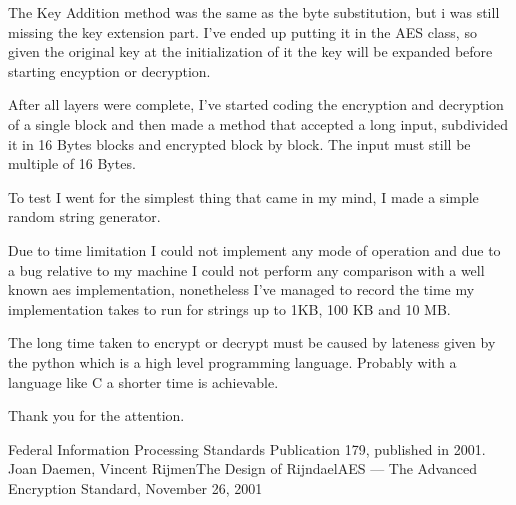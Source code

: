 \documentclass[11 pt]{article}
\begin{document}
The Key Addition method was the same as the byte substitution, but i was still missing the key extension part. I've ended up putting it in the AES class, so given the original key at the initialization of it the key will be expanded before starting encyption or decryption.

After all layers were complete, I've started coding the encryption and decryption of a single block and then made a method that accepted a long input, subdivided it in 16 Bytes blocks and encrypted block by block.
The input must still be multiple of 16 Bytes.

To test I went for the simplest thing that came in my mind, I made a simple random string generator.

Due to time limitation I could not implement any mode of operation and due to a bug relative to my machine I could not perform any comparison with a well known aes implementation, nonetheless I've managed to record the time my implementation takes to run for strings up to 1KB, 100 KB and 10 MB.

The long time taken to encrypt or decrypt must be caused by lateness given by the python which is a high level programming language. Probably with a language like C a shorter time is achievable.

Thank you for the attention.


\begin{thebibliography}{10}

	 Federal Information Processing Standards Publication 179, published in 2001.	
	 Joan Daemen, Vincent RijmenThe Design of RijndaelAES — The Advanced Encryption Standard, November 26, 2001
	
\end{thebibliography}
\end{document}
